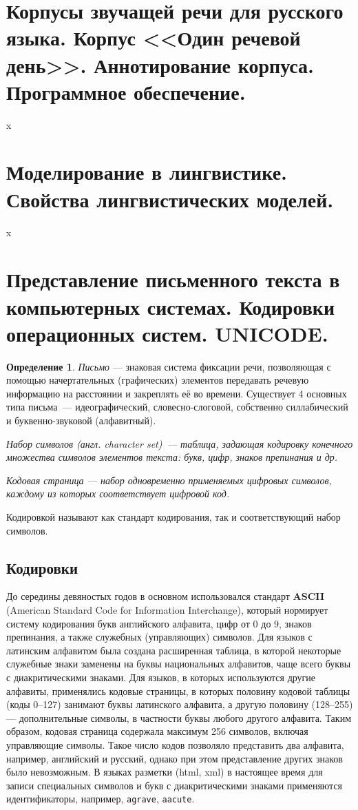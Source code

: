\documentclass[12pt]{article}
\theoremstyle{definition}
\newtheorem*{defn}{Определение}
\theoremstyle{remark}
\numberwithin{equation}{section}
\begin{document}
\section{Корпусы звучащей речи для русского языка. Корпус <<Один речевой день>>. Аннотирование корпуса. Программное обеспечение.}
x
\section{Моделирование в лингвистике.  Свойства лингвистических моделей.}
x
\section{Представление письменного текста в компьютерных системах. Кодировки операционных систем. UNICODE.}
\begin{defn}
\textit{Письмо} --- знаковая система фиксации речи, позволяющая с помощью начертательных (графических) элементов передавать речевую информацию на расстоянии и закреплять её во времени. Существует 4 основных типа письма~--- идеографический, словесно-слоговой, собственно силлабический и буквенно-звуковой (алфавитный).

\it{Набор символов (англ. character set)}~--– таблица, задающая кодировку конечного множества символов элементов текста: букв, цифр, знаков препинания и др.

\it{Кодовая страница} --– набор одновременно применяемых цифровых символов, каждому из которых соответствует цифровой код.
\end{defn}
Кодировкой называют как стандарт кодирования, так и соответствующий набор символов.

\subsection{Кодировки}
До середины девяностых годов в основном использовался стандарт \textbf{ASCII} (American Standard Code for Information Interchange), который нормирует систему кодирования букв английского алфавита, цифр от 0 до 9, знаков препинания, а также служебных (управляющих) символов. Для языков с латинским алфавитом была создана расширенная таблица, в которой некоторые служебные знаки заменены на буквы национальных алфавитов, чаще всего буквы с диакритическими знаками. Для языков, в которых используются другие алфавиты, применялись кодовые страницы, в которых половину кодовой таблицы (коды 0–127) занимают буквы латинского алфавита, а другую половину (128–255) --- дополнительные символы, в частности буквы любого другого алфавита. Таким образом, кодовая страница содержала максимум 256 символов, включая управляющие символы. Такое число кодов позволяло представить два алфавита, например, английский и русский, однако при этом представление других знаков было невозможным. В языках разметки (html, xml) в настоящее время для записи специальных символов и букв с диакритическими знаками применяются идентификаторы, например, \texttt{agrave}, \texttt{aacute}.
\end{document}

